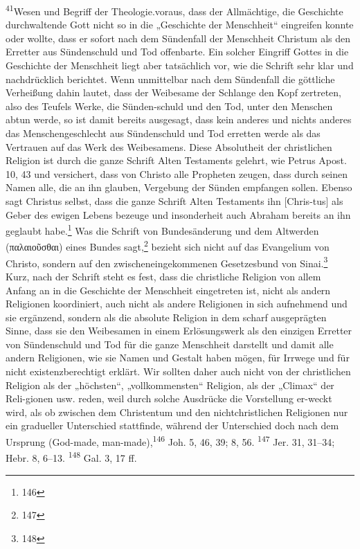 \textsuperscript{41}\n\hfill Wesen und Begriff der Theologie.\n{} voraus, dass der Allmächtige, die Geschichte durchwaltende Gott nicht so in die „Geschichte der Menschheit“ eingreifen konnte oder wollte, dass er sofort nach dem Sündenfall der Menschheit Christum als den Erretter aus Sündenschuld und Tod offenbarte. Ein solcher Eingriff Gottes in die Geschichte der Menschheit liegt aber tatsächlich vor, wie die Schrift sehr klar und nachdrücklich berichtet. Wenn unmittelbar nach dem Sündenfall die göttliche Verheißung dahin lautet, dass der Weibesame der Schlange den Kopf zertreten, also des Teufels Werke, die Sünden-schuld und den Tod, unter den Menschen abtun werde, so ist damit bereits ausgesagt, dass kein anderes und nichts anderes das Menschengeschlecht aus Sündenschuld und Tod erretten werde als das Vertrauen auf das Werk des Weibesamens. Diese Absolutheit der christlichen Religion ist durch die ganze Schrift Alten Testaments gelehrt, wie Petrus Apost. 10, 43 und versichert, dass von Christo alle Propheten zeugen, dass durch seinen Namen alle, die an ihn glauben, Vergebung der Sünden empfangen sollen. Ebenso sagt Christus selbst, dass die ganze Schrift Alten Testaments ihn [Chris-tus] als Geber des ewigen Lebens bezeuge und insonderheit auch Abraham bereits an ihn geglaubt habe.\footnote{146} Was die Schrift von Bundesänderung und dem Altwerden (\foreignlanguage{greek}{παλαιοῦσθαι}) eines Bundes sagt,\footnote{147} bezieht sich nicht auf das Evangelium von Christo, sondern auf den zwischeneingekommenen Gesetzesbund von Sinai.\footnote{148} Kurz, nach der Schrift steht es fest, dass die christliche Religion von allem Anfang an in die Geschichte der Menschheit eingetreten ist, nicht als andern Religionen koordiniert, auch nicht als andere Religionen in sich aufnehmend und sie ergänzend, sondern als die absolute Religion in dem scharf ausgeprägten Sinne, dass sie den Weibesamen in einem Erlösungswerk als den einzigen Erretter von Sündenschuld und Tod für die ganze Menschheit darstellt und damit alle andern Religionen, wie sie Namen und Gestalt haben mögen, für Irrwege und für nicht existenzberechtigt erklärt. Wir sollten daher auch nicht von der christlichen Religion als der „höchsten“, „vollkommensten“ Religion, als der „Climax“ der Reli-gionen usw. reden, weil durch solche Ausdrücke die Vorstellung er-weckt wird, als ob zwischen dem Christentum und den nichtchristlichen Religionen nur ein gradueller Unterschied stattfinde, während der Unterschied doch nach dem Ursprung (God-made, man-made),\n\n\vspace{10pt}\n\n\textsuperscript{146} Joh. 5, 46, 39; 8, 56. \textsuperscript{147} Jer. 31, 31--34; Hebr. 8, 6--13. \textsuperscript{148} Gal. 3, 17 ff.